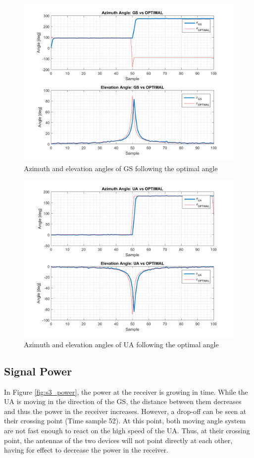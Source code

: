 \begin{figure}[H]
	\centering
	\includegraphics[scale=0.75]{figures/s3_gs.png}
	\caption{Azimuth and elevation angles of GS following the optimal angle}
	\label{fig:s3_gs}
\end{figure}

\begin{figure}[H]
	\centering
	\includegraphics[scale=0.75]{figures/s3_ua.png}
	\caption{Azimuth and elevation angles of UA following the optimal angle}
	\label{fig:s3_ua}
\end{figure}

\subsection*{Signal Power}
In Figure \ref{fig:s3_power}, the power at the receiver is growing in time. While the UA is moving in the direction of the GS, the distance between them decreases and thus the power in the receiver increases. However, a drop-off can be seen at their crossing point (Time sample 52). At this point, both moving angle system are not fast enough to react on the high speed of the UA. Thus, at their crossing point, the antennas of the two devices will not point directly at each other, having for effect to decrease the power in the receiver.

